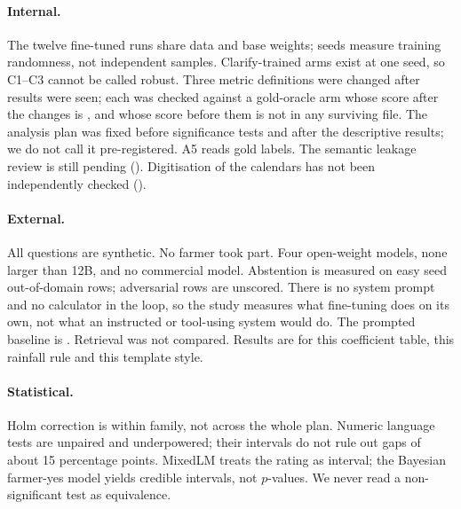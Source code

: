 \paragraph{Internal.}
The twelve fine-tuned runs share data and base weights; seeds measure training randomness, not independent samples. Clarify-trained arms exist at one seed, so C1--C3 cannot be called robust. Three metric definitions were changed after results were seen; each was checked against a gold-oracle arm whose score after the changes is \ChangeOracleAfter, and whose score before them is not in any surviving file. The analysis plan was fixed before significance tests and after the descriptive results; we do not call it pre-registered. A5 reads gold labels. The semantic leakage review is still pending (). Digitisation of the calendars has not been independently checked ().

\paragraph{External.}
All questions are synthetic. No farmer took part. Four open-weight models, none larger than 12B, and no commercial model. Abstention is measured on easy seed out-of-domain rows; \TestExcluded adversarial rows are unscored. There is no system prompt and no calculator in the loop, so the study measures what fine-tuning does on its own, not what an instructed or tool-using system would do. The prompted baseline is . Retrieval was not compared. Results are for this coefficient table, this rainfall rule and this template style.

\paragraph{Statistical.}
Holm correction is within family, not across the whole plan. Numeric language tests are unpaired and underpowered; their intervals do not rule out gaps of about 15 percentage points. MixedLM treats the rating as interval; the Bayesian farmer-yes model yields credible intervals, not $p$-values. We never read a non-significant test as equivalence.
